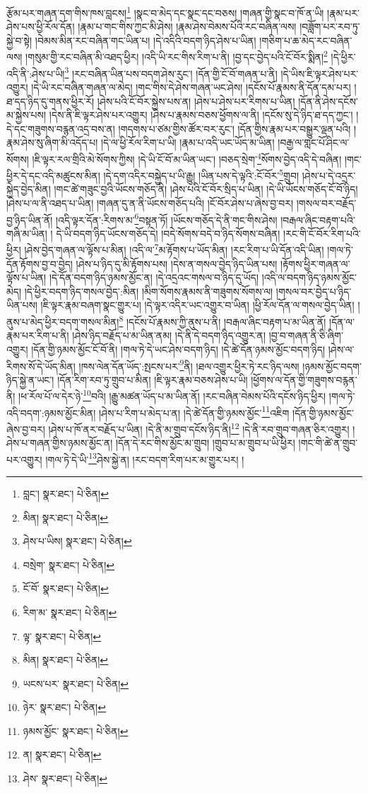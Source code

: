 རྩོམ་པར་གཞན་དག་གིས་ཁས་བླངས།\footnote{བླང་།  སྣར་ཐང་།  པེ་ཅིན། } །སྣང་བ་མེད་དང་སྣང་དང་བཅས། །གཞན་གྱི་སྣང་བ་ཁོ་ན་ཡི། །རྣམ་པར་ཤེས་པས་ཕྱི་རོལ་དོན། །རྣམ་པ་གང་གིས་ཀྱང་མི་ཤེས། །རྣམ་ཤེས་བེམས་པོའི་རང་བཞིན་ལས། །བཟློག་པར་རབ་ཏུ་སྐྱེ་བ་སྟེ། །བེམས་མིན་རང་བཞིན་གང་ཡིན་པ། །དེ་འདིའི་བདག་ཉིད་ཤེས་པ་ཡིན། །གཅིག་པ་ཆ་མེད་རང་བཞིན་ལས། །གསུམ་གྱི་རང་བཞིན་མི་འཐད་ཕྱིར། །འདི་ཡི་རང་གིས་རིག་པ་ནི། །བྱ་དང་བྱེད་པའི་ངོ་བོར་སྨིན།\footnote{མིན།  སྣར་ཐང་།  པེ་ཅིན། } །དེ་ཕྱིར་འདི་ནི་:ཤེས་པ་ཡི།\footnote{ཤེས་པ་ཡིས།  སྣར་ཐང་།  པེ་ཅིན། } །རང་བཞིན་ཡིན་པས་བདག་ཤེས་རུང་། །དོན་གྱི་ངོ་བོ་གཞན་པ་ནི། །དེ་ཡིས་ཇི་ལྟར་ཤེས་པར་འགྱུར། །དེ་ཡི་རང་བཞིན་གཞན་ལ་མེད། །གང་གིས་དེ་ཤེས་གཞན་ཡང་ཤེས། །དངོས་པོ་རྣམས་ནི་དོན་དམ་པར། །ཐ་དད་ཉིད་དུ་གནས་ཕྱིར་རོ། །ཤེས་པའི་ངོ་བོར་སྐྱེས་པས་ན། །ཤེས་པ་ཤེས་པར་རིགས་པ་ཡིན། །དོན་ནི་ཤེས་དངོས་མ་སྐྱེས་པས། །དེས་ནི་ཇི་ལྟར་ཤེས་པར་འགྱུར། །ཤེས་པ་རྣམས་བཅས་ཕྱོགས་ལ་ནི། །དངོས་སུ་དེ་ཉིད་ཐ་དད་ཀྱང་། །དེ་དང་གཟུགས་བརྙན་འདྲ་བས་ན། །གདགས་པ་ཙམ་གྱིས་ཚོར་བར་རུང་། །དོན་གྱིས་རྣམ་པར་བསྒྱུར་ལྡན་པའི། །རྣམ་ཤེས་སུ་ཞིག་མི་འདོད་པ། །དེ་ལ་ཕྱི་རོལ་རིག་པ་ཡི། །རྣམ་པ་འདི་ཡང་ཡོད་མ་ཡིན། །བརྒྱ་ལ་གླང་པོ་ཤིང་ལ་སོགས། །ཇི་ལྟར་རལ་གྲིའི་མེ་སོགས་ཀྱིས། །དེ་ཡི་ངོ་བོ་མ་ཡིན་ཡང་། །བཅད་སྲེག་\footnote{བསྲེག་  སྣར་ཐང་།  པེ་ཅིན། }སོགས་བྱེད་འདི་དེ་བཞིན། །གང་ཕྱིར་དེ་དང་འདི་མཚུངས་མིན། །དེ་དག་འདིར་བསྐྱེད་པ་ཡི་རྒྱུ། །ཡིན་པས་དེ་ལྟའི་:ངོ་བོར་\footnote{ངོ་བོ་  སྣར་ཐང་།  པེ་ཅིན། }གྲུབ། །ཤེས་པ་དེ་འདྲར་སྐྱེད་བྱེད་མིན། །གང་ཚེ་གཟུང་བྱའི་ཡོངས་གཅོད་ནི། །ཤེས་པའི་ངོ་བོར་སྲིད་པ་ཡིན། །དེ་ཡི་ཡོངས་གཅོད་ངོ་བོ་ཉིད། །ཤེས་པ་ལ་ནི་འཐད་པ་ཡིན། །གཞན་དུ་ན་ནི་ཡོངས་གཅོད་པའི། །ངོ་བོར་ཤེས་པ་ཞེས་བྱ་བར། །གསལ་བར་བརྗོད་བྱ་ཉིད་ཡིན་ནོ། །འདི་ལྟར་དོན་:རིགས་མ་\footnote{རིག་མ་  སྣར་ཐང་།  པེ་ཅིན། }བསྟན་ཏོ། །ཡོངས་གཅོད་དེ་ནི་གང་གིས་ཤེས། །བརྒལ་ཞིང་བརྟག་པའི་གཞི་མ་ཡིན། །
དེ་ཡི་བདག་ཉིད་ཡོངས་གཅོད་དེ། །བདེ་སོགས་བདེ་བ་ཉིད་སོགས་བཞིན། །རང་གི་ངོ་བོར་རིག་པའི་ཕྱིར། །ཤེས་བྱེད་གཞན་ལ་ལྟོས་པ་མིན། །འདི་ལ་\footnote{ལྟ་  སྣར་ཐང་།  པེ་ཅིན། }མ་རྟོགས་པ་ཡོད་མིན། །རང་རིག་པ་ཡི་དོན་འདི་ཡིན། །གལ་ཏེ་དོན་རྟོགས་བྱ་བ་བྱེད། །ཤེས་པ་ཉིད་དུ་མི་རྟོགས་པས། །དེས་ན་གསལ་བྱེད་ཉིད་ཡིན་པས། །རྟོགས་ཕྱིར་གཞན་ལ་ལྟོས་པ་ཡིན། །དེ་དོན་བདག་ཉིད་ཉམས་མྱོང་ན། །དེ་འདྲའང་གསལ་བ་ཉིད་དུ་ཡོད། །འདི་ལ་བདག་ཉིད་ཉམས་མྱོང་མེད། །དེ་ཕྱིར་བདག་ཉིད་གསལ་བྱེད་:མིན། །མིག་སོགས་རྣམས་ནི་གཟུགས་སོགས་ལ། །གསལ་བར་བྱེད་པ་ཉིད་ཡིན་པས། །ཇི་ལྟར་རྣམ་བཞག་སྣང་གྱུར་པ། །དེ་ལྟར་འདིར་ཡང་འགྱུར་བ་ཡིན། །ཕྱི་རོལ་དོན་ལ་གསལ་བྱེད་ཡིན། །ནུས་པ་མེད་ཕྱིར་བདག་གསལ་མིན།\footnote{མིན།  སྣར་ཐང་།  པེ་ཅིན། } །དངོས་པོ་རྣམས་ཀྱི་ནུས་པ་ནི། །བརྒལ་ཞིང་བརྟག་པ་མ་ཡིན་ནོ། །དོན་ལ་རྣམ་པར་རིག་པ་ནི། །ཤེས་ཉིད་བརྗོད་པ་མ་ཡིན་ནམ། །དེ་ནི་དེ་བདག་ཉིད་འགྱུར་ན། །བྱ་བ་གཞན་ནི་ཅི་ཞིག་འགྱུར། །དོན་གྱི་ཉམས་མྱོང་ངོ་བོ་ནི། །གལ་ཏེ་དེ་ཡང་ཤེས་བདག་ཉིད། །དེ་ཚེ་དོན་ཉམས་མྱོང་བདག་ཉིད། །ཤེས་ལ་རིགས་སོ་དེ་ཡོད་མིན། །ཁས་ལེན་དོན་ཡོད་:སྤངས་པར་\footnote{ཡངས་པར་  སྣར་ཐང་།  པེ་ཅིན། }ནི། །ཐལ་འགྱུར་ཕྱིར་ཏེ་རང་ཉིད་ལས། །ཉམས་མྱོང་བདག་ཉིད་སྐྱེ་ན་ཡང་། །དོན་རིག་རབ་ཏུ་གྲུབ་པ་མིན། །ཇི་ལྟར་རྣམ་བཅས་ཤེས་པ་ཡི། །ཕྱོགས་ལ་དོན་གྱི་གཟུགས་བརྙན་ནི། །ཕ་རོལ་པོ་ལ་དེར་ཉེ་\footnote{ཉེར་  སྣར་ཐང་།  པེ་ཅིན། }བའི། །རྒྱུ་མཚན་ཡོད་པ་མ་ཡིན་ནོ། །རང་བཞིན་བེམས་པོའི་དངོས་ཉིད་ཕྱིར། །གལ་ཏེ་འདི་བདག་:ཉམས་མྱོང་མིན། །ཤེས་པ་རིག་པ་མེད་པ་ན། །དེ་ཚེ་དོན་གྱི་ཉམས་མྱོང་\footnote{ཉམས་མྱོང་  སྣར་ཐང་།  པེ་ཅིན། }འཇིག །དོན་གྱི་ཉམས་མྱོང་ཞེས་བྱ་བར། །ཤེས་པ་ཁོ་ནར་བརྗོད་པ་ཡིན། །དེ་ནི་མ་གྲུབ་དངོས་ཉིད་ནི།\footnote{ན།  སྣར་ཐང་།  པེ་ཅིན། } །དེ་ནི་རབ་གྲུབ་གཞན་ཅིར་འགྱུར། །ཤེས་པ་གཞན་གྱིས་ཉམས་མྱོང་ན། །དོན་དེ་རང་གིས་མྱོང་མ་གྲུབ། །གྲུབ་པ་མ་གྲུབ་པ་ཡི་ཕྱིར། །གང་གི་ཚེ་ན་གྲུབ་པར་འགྱུར། །གལ་ཏེ་དེ་ཡི་\footnote{ཤེས་  སྣར་ཐང་།  པེ་ཅིན། }ཤེས་སྐྱེ་ན། །རང་བདག་རིག་པར་མ་གྱུར་པར། །
